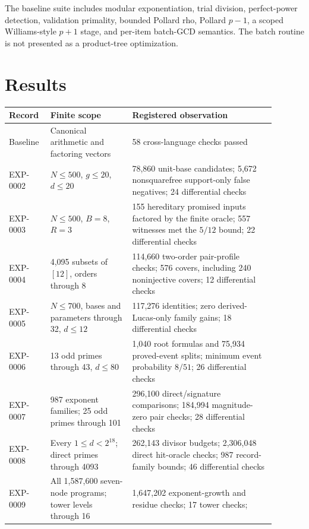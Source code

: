 \documentclass[11pt]{article}
\begin{document}
The baseline suite includes modular exponentiation, trial division,
perfect-power detection, validation primality, bounded Pollard rho, Pollard
\(p-1\), a scoped Williams-style \(p+1\) stage, and per-item batch-GCD
semantics. The batch routine is not presented as a product-tree optimization.

\section{Results}

\begin{center}
\scriptsize
\begin{tabular}{L{0.12\linewidth}L{0.28\linewidth}L{0.49\linewidth}}
\toprule
Record & Finite scope & Registered observation \\
\midrule
Baseline & Canonical arithmetic and factoring vectors &
58 cross-language checks passed \\
\addlinespace
EXP-0002 & \(N\le500\), \(g\le20\), \(d\le20\) &
78,860 unit-base candidates; 5,672 nonsquarefree support-only false
negatives; 24 differential checks \\
\addlinespace
EXP-0003 & \(N\le500\), \(B=8\), \(R=3\) &
155 hereditary promised inputs factored by the finite oracle; 557 witnesses
met the \(5/12\) bound; 22 differential checks \\
\addlinespace
EXP-0004 & 4,095 subsets of \([12]\), orders through 8 &
114,660 two-order pair-profile checks; 576 covers, including 240
noninjective covers; 12 differential checks \\
\addlinespace
EXP-0005 & \(N\le700\), bases and parameters through 32, \(d\le12\) &
117,276 identities; zero derived-Lucas-only family gains; 18 differential
checks \\
\addlinespace
EXP-0006 & 13 odd primes through 43, \(d\le80\) &
1,040 root formulas and 75,934 proved-event splits; minimum event probability
\(8/51\); 26 differential checks \\
\addlinespace
EXP-0007 & 987 exponent families; 25 odd primes through 101 &
296,100 direct/signature comparisons; 184,994 magnitude-zero pair checks;
28 differential checks \\
\addlinespace
EXP-0008 & Every \(1\le d<2^{18}\); direct primes through 4093 &
262,143 divisor budgets; 2,306,048 direct hit-oracle checks; 987
record-family bounds; 46 differential checks \\
\addlinespace
EXP-0009 & All 1,587,600 seven-node programs; tower levels through 16 &
1,647,202 exponent-growth and residue checks; 17 tower checks;

\end{tabular}
\end{center}
\end{document}
